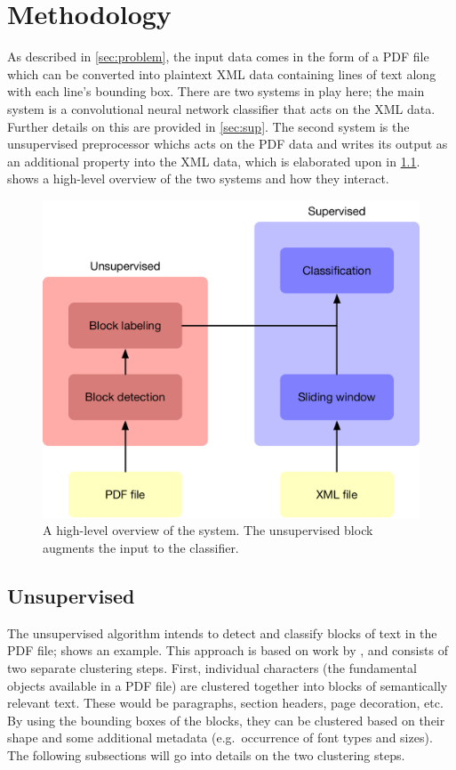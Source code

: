 \section{Methodology}%
\label{sec:method}

As described in \cref{sec:problem}, the input data comes in the form of a
PDF file which can be converted into plaintext XML data containing lines of text
along with each line's bounding box. There are two systems in play here; the
main system is a convolutional neural network classifier that acts on the XML
data. Further details on this are provided in \cref{sec:sup}. The second
system is the unsupervised preprocessor whichs acts on the PDF data and writes
its output as an additional property into the XML data, which is elaborated upon
in \cref{sec:unsup}.  shows a high-level
overview of the two systems and how they interact.

\begin{figure}[htb]
  \centering
  \includegraphics[width=\textwidth]{figures/layout.pdf}
  \caption{A high-level overview of the system. The unsupervised block augments
  the input to the classifier.}%
  \label{fig:overview}
\end{figure}

\subsection{Unsupervised}%
\label{sec:unsup}
The unsupervised algorithm intends to detect and classify blocks of text in the
PDF file;  shows an example. This approach is based on
work by \textcite{klampfl2014unsupervised}, and consists of two separate
clustering steps. First, individual characters (the fundamental objects
available in a PDF file) are clustered together into blocks of semantically
relevant text. These would be paragraphs, section headers, page decoration, etc.
By using the bounding boxes of the blocks, they can be clustered based on their
shape and some additional metadata (e.g.\ occurrence of font types and sizes).
The following subsections will go into details on the two clustering steps.

